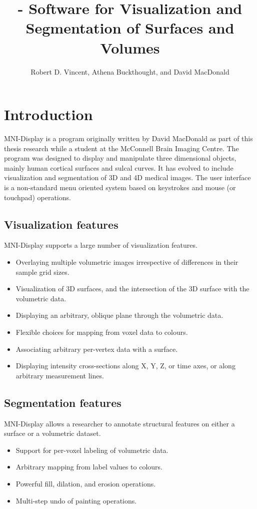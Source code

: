 \documentclass[11pt,letterpaper]{article}
\title{{\bf \display} - Software for Visualization and Segmentation of Surfaces and Volumes}
\author{Robert D. Vincent, Athena Buckthought, and David MacDonald}
\newcommand{\display}{\mbox{MNI-Display}}
\begin{document}
\maketitle

\setcounter{tocdepth}{2}
\tableofcontents

\newpage

\section{Introduction}

\display{} is a program originally written by David MacDonald as part of
this thesis research while a student at the McConnell Brain Imaging
Centre. The program was designed to display and manipulate three
dimensional objects, mainly human cortical surfaces and sulcal
curves. It has evolved to include visualization and segmentation of 3D
and 4D medical images. The user interface is a non-standard menu
oriented system based on keystrokes and mouse (or touchpad) operations.

\subsection{Visualization features}
\display{} supports a large number of visualization features.
\begin{itemize}
\item Overlaying multiple volumetric images irrespective of differences in their sample grid sizes.
\item Visualization of 3D surfaces, and the intersection of the 3D surface with the volumetric data.
\item Displaying an arbitrary, oblique plane through the volumetric data.
\item Flexible choices for mapping from voxel data to colours.
\item Associating arbitrary per-vertex data with a surface.
\item Displaying intensity cross-sections along X, Y, Z, or time axes,
  or along arbitrary measurement lines.
\end{itemize}

\subsection{Segmentation features}
\display{} allows a researcher to annotate structural features on either a surface or a volumetric dataset.
\begin{itemize}
\item Support for per-voxel labeling of volumetric data.
\item Arbitrary mapping from label values to colours.
\item Powerful fill, dilation, and erosion operations.
\item Multi-step undo of painting operations.
\end{itemize}
\end{document}
